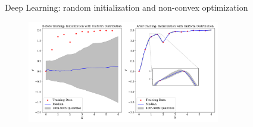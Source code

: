 \documentclass[aspectratio=169,10pt]{beamer}
\begin{document}
\begin{frame}{Deep Learning: random initialization and non-convex optimization  }
\label{dif_dist}
	
	\begin{figure}[t!]
		\centering
		\includegraphics[width=0.75\textwidth]{figs/smooth_interpolation_100_seeds_uniform_init.pdf}
	\end{figure}
	\hyperlink{non_convex}{}
\end{frame}
\end{document}
